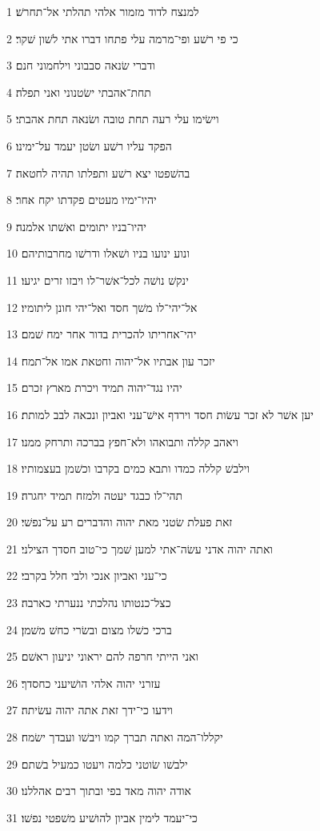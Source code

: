 \par 1 למנצח לדוד מזמור אלהי תהלתי אל־תחרשׁ׃
\par 2 כי פי רשׁע ופי־מרמה עלי פתחו דברו אתי לשׁון שׁקר׃
\par 3 ודברי שׂנאה סבבוני וילחמוני חנם׃
\par 4 תחת־אהבתי ישׂטנוני ואני תפלה׃
\par 5 וישׂימו עלי רעה תחת טובה ושׂנאה תחת אהבתי׃
\par 6 הפקד עליו רשׁע ושׂטן יעמד על־ימינו׃
\par 7 בהשׁפטו יצא רשׁע ותפלתו תהיה לחטאה׃
\par 8 יהיו־ימיו מעטים פקדתו יקח אחר׃
\par 9 יהיו־בניו יתומים ואשׁתו אלמנה׃
\par 10 ונוע ינועו בניו ושׁאלו ודרשׁו מחרבותיהם׃
\par 11 ינקשׁ נושׁה לכל־אשׁר־לו ויבזו זרים יגיעו׃
\par 12 אל־יהי־לו משׁך חסד ואל־יהי חונן ליתומיו׃
\par 13 יהי־אחריתו להכרית בדור אחר ימח שׁמם׃
\par 14 יזכר עון אבתיו אל־יהוה וחטאת אמו אל־תמח׃
\par 15 יהיו נגד־יהוה תמיד ויכרת מארץ זכרם׃
\par 16 יען אשׁר לא זכר עשׂות חסד וירדף אישׁ־עני ואביון ונכאה לבב למותת׃
\par 17 ויאהב קללה ותבואהו ולא־חפץ בברכה ותרחק ממנו׃
\par 18 וילבשׁ קללה כמדו ותבא כמים בקרבו וכשׁמן בעצמותיו׃
\par 19 תהי־לו כבגד יעטה ולמזח תמיד יחגרה׃
\par 20 זאת פעלת שׂטני מאת יהוה והדברים רע על־נפשׁי׃
\par 21 ואתה יהוה אדני עשׂה־אתי למען שׁמך כי־טוב חסדך הצילני׃
\par 22 כי־עני ואביון אנכי ולבי חלל בקרבי׃
\par 23 כצל־כנטותו נהלכתי ננערתי כארבה׃
\par 24 ברכי כשׁלו מצום ובשׂרי כחשׁ משׁמן׃
\par 25 ואני הייתי חרפה להם יראוני יניעון ראשׁם׃
\par 26 עזרני יהוה אלהי הושׁיעני כחסדך׃
\par 27 וידעו כי־ידך זאת אתה יהוה עשׂיתה׃
\par 28 יקללו־המה ואתה תברך קמו ויבשׁו ועבדך ישׂמח׃
\par 29 ילבשׁו שׂוטני כלמה ויעטו כמעיל בשׁתם׃
\par 30 אודה יהוה מאד בפי ובתוך רבים אהללנו׃
\par 31 כי־יעמד לימין אביון להושׁיע משׁפטי נפשׁו׃

